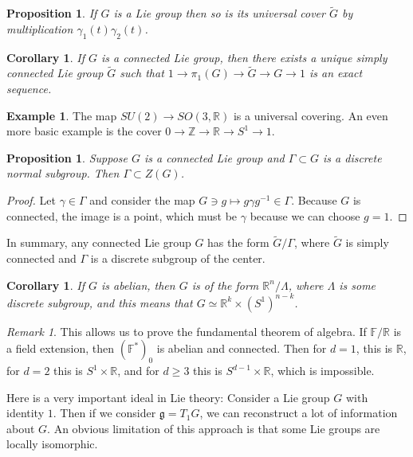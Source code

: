 \documentclass[leqno, openany]{memoir}
\newtheorem{cor}[thm]{Corollary}
\newtheorem{prop}[thm]{Proposition}
\theoremstyle{definition}
\newtheorem{exm}[thm]{Example}
\theoremstyle{remark}
\newtheorem{rmk}[thm]{Remark}
\theoremstyle{plain}
\theoremstyle{definition}
\theoremstyle{remark}
\newcommand{\F}{\mathbb{F}}
\newcommand{\R}{\mathbb{R}}
\newcommand{\Z}{\mathbb{Z}}
\newcommand{\mf}[1]{\mathfrak{#1}}
\newcommand{\wtl}[1]{\widetilde{#1}}
\begin{document}
\begin{prop}
    If $G$ is a Lie group then so is its universal cover $\wtl{G}$ by multiplication $\gamma_1(t) \gamma_2(t)$.
\end{prop}

\begin{cor}
    If $G$ is a connected Lie group, then there exists a unique simply connected Lie group $\wtl{G}$ such that $1 \to \pi_1(G) \to \wtl{G} \to G \to 1$ is an exact sequence.
\end{cor}

\begin{exm}
    The map $SU(2) \to SO(3, \R)$ is a universal covering. An even more basic example is the cover $0 \to \Z \to \R \to S^1 \to 1$.
\end{exm}

\begin{prop}
    Suppose $G$ is a connected Lie group and $\Gamma \subset G$ is a discrete normal subgroup. Then $\Gamma \subset Z(G)$.
\end{prop}

\begin{proof}
    Let $\gamma \in \Gamma$ and consider the map $G \ni g \mapsto g \gamma g^{-1} \in \Gamma$. Because $G$ is connected, the image is a point, which must be $\gamma$ because we can choose $g = 1$.
\end{proof}

In summary, any connected Lie group $G$ has the form $\wtl{G} / \Gamma$, where $\wtl{G}$ is simply connected and $\Gamma$ is a discrete subgroup of the center.

\begin{cor}
    If $G$ is abelian, then $G$ is of the form $\R^n / \Lambda$, where $\Lambda$ is some discrete subgroup, and this means that $G \simeq \R^k \times (S^1)^{n-k}$.
\end{cor}

\begin{rmk}
    This allows us to prove the fundamental theorem of algebra. If $\F/\R$ is a field extension, then $( \F^* )_0$ is abelian and connected. Then for $d = 1$, this is $\R$, for $d = 2$ this is $S^1 \times \R$, and for $d \geq 3$ this is $S^{d-1} \times \R$, which is impossible.
\end{rmk}


Here is a very important ideal in Lie theory: Consider a Lie group $G$ with identity $1$. Then if we consider $\mf{g} = T_1 G$, we can reconstruct a lot of information about $G$. An obvious limitation of this approach is that some Lie groups are locally isomorphic.
\end{document}
